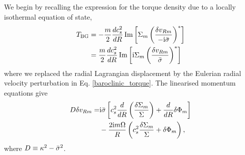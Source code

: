 We begin by recalling the expression for the torque density due to a
locally isothermal equation of state,
\begin{align}
  T_\mathrm{BG} &= -\frac{m}{2}\frac{dc_s^2}{dR}\operatorname{Im}\left[\Sigma_m \left(\frac{\delta
        v_{Rm}}{-\mathrm{i}\bar{\sigma}}\right)^*\right] \notag\\
  & = \frac{m}{2}\frac{dc_s^2}{dR}\operatorname{Im}\left[\mathrm{i} \Sigma_m \left(\frac{\delta
        v_{Rm}}{\bar{\sigma}}\right)^*\right]
\end{align}
where we replaced the radial Lagrangian displacement by the Eulerian
radial velocity perturbation in Eq. \ref{baroclinic_torque}. 
The linearised momentum equations give
\begin{align}
  D\delta v_{Rm} =& 
  \mathrm{i}\bar{\sigma}\left[c_s^2\frac{d}{dR}\left(\frac{\delta\Sigma_m}{\Sigma}\right)
    + \frac{d}{dR}\delta\Phi_m\right] \notag\\ 
  &- \frac{2\mathrm{i}
    m\Omega}{R}\left(c_s^2\frac{\delta\Sigma_m}{\Sigma} +
    \delta\Phi_m\right),
\end{align}
where $D\equiv \kappa^2 - \bar{\sigma}^2$. 

